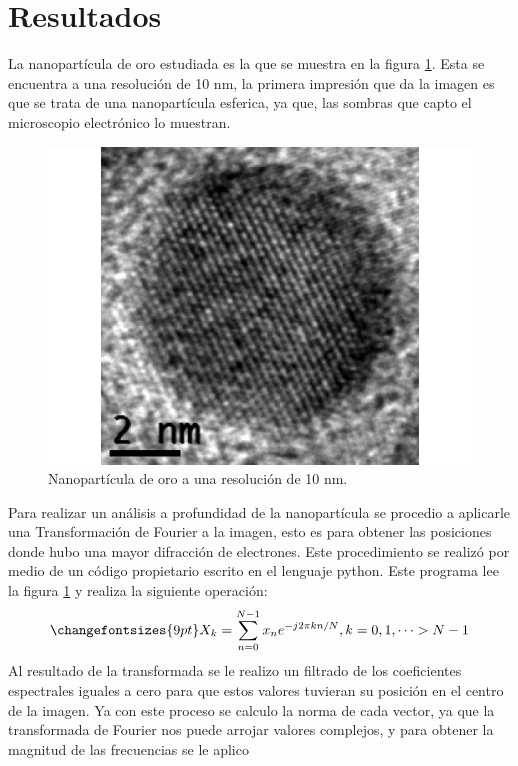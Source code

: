 \documentclass[reprint,amsmath,amssymb,aps,]{revtex4-2}
\begin{document}
\section{Resultados}
La nanopartícula de oro estudiada es la que se muestra en la figura \ref{fig:nanoparticula}. Esta se encuentra a una resolución de 10 nm,
la primera impresión que da la imagen es que se trata de una nanopartícula esferica, ya que, las sombras que capto el microscopio electrónico
lo muestran.
\begin{figure}[H]
    \centering
    \includegraphics[scale=0.45]{../Graphics/Original.png}
    \caption{Nanopartícula de oro a una resolución de 10 nm.}
    \label{fig:nanoparticula}
\end{figure}
Para realizar un análisis a profundidad de la nanopartícula se procedio a aplicarle una Transformación de Fourier a la imagen, esto es para obtener 
las posiciones donde hubo una mayor difracción de electrones. Este procedimiento se realizó por medio de un código propietario escrito en el lenguaje python.
Este programa lee la figura \ref{fig:nanoparticula} y realiza la siguiente operación:
\begin{equation}
    \changefontsizes{9pt}
    X_k = \sum_{n=0}^{N-1} x_n e^{-j2\pi kn/N} , k=0,1,\cdots > N-1
    \label{eq:dft}
\end{equation}
Al resultado de la transformada se le realizo un filtrado de los coeficientes espectrales iguales a cero para que estos valores tuvieran su posición en el centro de la imagen.
Ya con este proceso se calculo la norma de cada vector, ya que la transformada de Fourier nos puede arrojar valores complejos, y para obtener la magnitud de las frecuencias se le aplico
\end{document}
